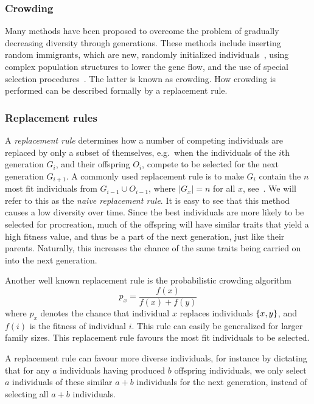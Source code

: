 \subsubsection{Crowding}
Many methods have been proposed to overcome the problem of gradually decreasing diversity through generations. These methods include inserting random immigrants, which are new, randomly initialized individuals~\cite{Cobb93geneticalgorithms}, using complex population structures to lower the gene flow, and the use of special selection procedures~\cite{ursem2002diversity}. The latter is known as crowding.  How crowding is performed can be described formally by a replacement rule.

\subsubsection{Replacement rules}
A \emph{replacement rule} determines how a number of competing individuals are replaced by only a subset of themselves, e.g.\ when the individuals of the $i$th generation $G_i$, and their offspring $O_i$, compete to be selected for the next generation $G_{i+1}$. A commonly used replacement rule is to make $G_i$ contain the $n$ most fit individuals from $G_{i-1} \cup O_{i-1}$, where $\mid G_x\mid = n$ for all $x$, see~\cite{masterThesisGANN}. We will refer to this as the \emph{naive replacement rule}. It is easy to see that this method causes a low diversity over time. Since the best individuals are more likely to be selected for procreation, much of the offspring will have similar traits that yield a high fitness value, and thus be a part of the next generation, just like their parents. Naturally, this increases the chance of the same traits being carried on into the next generation.

Another well known replacement rule is the probabilistic crowding algorithm~\cite{Mengshoel_and_Goldberg:1999}
%
\[
  p_x = \frac{f(x)}{f(x)+f(y)}
\]
%
where $p_x$ denotes the chance that individual $x$ replaces individuals $\{ x, y \}$, and $f(i)$ is the fitness of individual $i$. This rule can easily be generalized for larger family sizes. This replacement rule favours the most fit individuals to be selected.

A replacement rule can favour more diverse individuals, for instance by dictating that for any $a$ individuals having produced $b$ offspring individuals, we only select $a$ individuals of these similar $a + b$ individuals for the next generation, instead of selecting all $a + b$ individuals.

